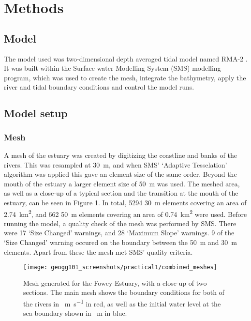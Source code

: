 \documentclass{article}
\begin{document}
\section{Methods}

\subsection{Model}

The model used was two-dimensional depth averaged tidal model named RMA-2 \parencite{king1990program}. It was built within the Surface-water Modelling System (SMS) modelling program, which was used to create the mesh, integrate the bathymetry, apply the river and tidal boundary conditions and control the model runs.

\subsection{Model setup}

\subsubsection{Mesh}
A mesh of the estuary was created by digitizing the coastline and banks of the rivers. This was resampled at \SI{30}{m}, and when SMS' `Adaptive Tesselation' algorithm was applied this gave an element size of the same order. Beyond the mouth of the estuary a larger element size of \SI{50}{m} was used. The meshed area, as well as a close-up of a typical section and the transition at the mouth of the estuary, can be seen in Figure \ref{fig:combined_meshes}. In total, 5294 \SI{30}{m} elements covering an area of \SI{2.74}{km^{2}}, and 662 \SI{50}{m} elements covering an area of \SI{0.74}{km^{2}} were used. Before running the model, a quality check of the mesh was performed by SMS. There were 17 `Size Changed' warnings, and 28 `Maximum Slope' warnings. 9 of the `Size Changed' warning occured on the boundary between the \SI{50}{m} and \SI{30}{m} elements. Apart from these the mesh met SMS' quality criteria.


\begin{figure}[hbp]
    \centering
    \texttt{[image: geogg101\_screenshots/practical1/combined\_meshes]}
    \caption{Mesh generated for the Fowey Estuary, with a close-up of two sections. The main mesh shows the boundary conditions for both of the rivers in \SI{}{m.s^{-1}} in red, as well as the initial water level at the sea boundary shown in \SI{}{m} in blue.}
    \label{fig:combined_meshes}
\end{figure}
\end{document}
